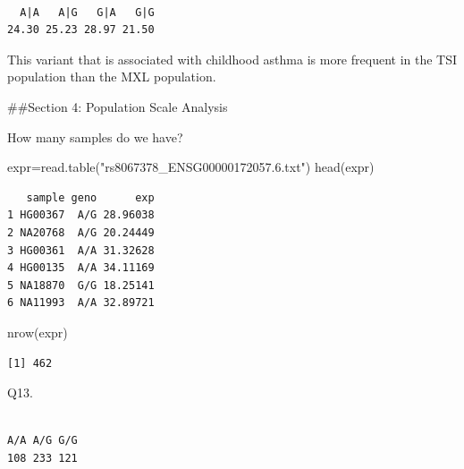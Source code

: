 \documentclass[
  letterpaper,
  DIV=11,
  numbers=noendperiod]{scrartcl}
\newenvironment{Shaded}{\begin{snugshade}}{\end{snugshade}}
\newcommand{\FunctionTok}[1]{\textcolor[rgb]{0.28,0.35,0.67}{#1}}
\newcommand{\NormalTok}[1]{\textcolor[rgb]{0.00,0.23,0.31}{#1}}
\newcommand{\OtherTok}[1]{\textcolor[rgb]{0.00,0.23,0.31}{#1}}
\newcommand{\SpecialCharTok}[1]{\textcolor[rgb]{0.37,0.37,0.37}{#1}}
\newcommand{\StringTok}[1]{\textcolor[rgb]{0.13,0.47,0.30}{#1}}
\begin{document}
\begin{verbatim}

  A|A   A|G   G|A   G|G 
24.30 25.23 28.97 21.50 
\end{verbatim}

This variant that is associated with childhood asthma is more frequent
in the TSI population than the MXL population.

\#\#Section 4: Population Scale Analysis

How many samples do we have?

\begin{Shaded}
\begin{Highlighting}[]
\NormalTok{expr}\OtherTok{=}\FunctionTok{read.table}\NormalTok{(}\StringTok{"rs8067378\_ENSG00000172057.6.txt"}\NormalTok{)}
\FunctionTok{head}\NormalTok{(expr)}
\end{Highlighting}
\end{Shaded}

\begin{verbatim}
   sample geno      exp
1 HG00367  A/G 28.96038
2 NA20768  A/G 20.24449
3 HG00361  A/A 31.32628
4 HG00135  A/A 34.11169
5 NA18870  G/G 18.25141
6 NA11993  A/A 32.89721
\end{verbatim}

\begin{Shaded}
\begin{Highlighting}[]
\FunctionTok{nrow}\NormalTok{(expr)}
\end{Highlighting}
\end{Shaded}

\begin{verbatim}
[1] 462
\end{verbatim}

Q13.

\begin{Shaded}
\end{Shaded}

\begin{verbatim}

A/A A/G G/G 
108 233 121 
\end{verbatim}

\begin{Shaded}
\end{Shaded}
\end{document}
